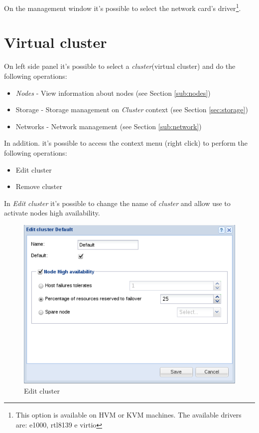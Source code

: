 On the management window it's possible to select the network card's driver\footnote{This option is available on HVM or KVM machines. The available drivers are: e1000, rtl8139 e virtio}.

\section{Virtual cluster}
\label{sec:cluster}

On left side panel it's possible to select a \emph{cluster}(virtual cluster) and do the following operations:

\begin{itemize}
    \item \emph{Nodes} - View information about nodes (see Section \ref{sub:nodes})
    \item Storage - Storage management on \emph{Cluster} context (see Section \ref{sec:storage})
    \item Networks - Network management (see Section \ref{sub:network})
\end{itemize}

In addition. it's possible to access the context menu (right click) to perform the following operations:
\begin{itemize}
    \item Edit cluster
    \item Remove cluster
\end{itemize}

In \emph{Edit cluster} it's possible to change the name of \emph{cluster} and allow use to activate nodes high availability.
\begin{figure}[H]
       \begin{center}
       \includegraphics[scale=0.5]{screenshots/cluster_edit.png}
       \caption{Edit cluster}
       \label{fig:cluster_edit}
       \end{center}
\end{figure}

